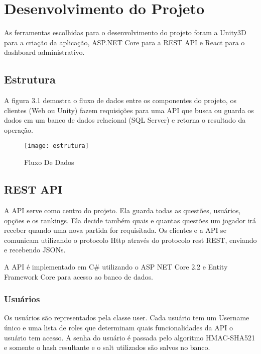 \chapter{Desenvolvimento do Projeto}
\label{chap:desenv}

As ferramentas escolhidas para o desenvolvimento do projeto foram a Unity3D para a criação da aplicação, ASP.NET Core para a REST API e React para o dashboard administrativo.
 
\section{Estrutura}
\label{sec:estrutura}

A figura 3.1 demostra o fluxo de dados entre os componentes do projeto, os clientes (Web ou Unity) fazem requisições  para uma API que busca ou guarda os dados em um banco de dados relacional (SQL Server) e retorna o resultado da operação.

\begin{figure}[htb]
\caption{\label{fig:estrutura} Fluxo De Dados }
\begin{center}
\texttt{[image: estrutura]}
\end{center}
\end{figure}


\section{REST API}
\label{sec:restapi}


A API serve como centro do projeto. Ela guarda todas as questões, usuários, opções e os rankings. Ela decide também quais e quantas questões um jogador irá receber quando uma nova partida for requisitada. 
Os clientes e a API se comunicam utilizando o protocolo Http\cite{fielding_reschke_2014} através do protocolo rest  REST\cite{wwrest}, enviando e recebendo JSONs.

A API é implementado em C\# utilizando o ASP NET Core 2.2\cite{aspnetcore} e Entity Framework Core\cite{entityFramework} para acesso ao banco de dados.

\subsection{Usuários}
\label{subsec:usuários}

Os usuários são representados pela classe user. Cada usuário tem um Username único e uma lista de roles que determinam quais funcionalidades da API o usuário tem acesso. A senha do usuário é passada pelo algoritmo HMAC-SHA521\cite{rcfHAMAC} e somente o hash resultante e o salt utilizados são salvos no banco.

